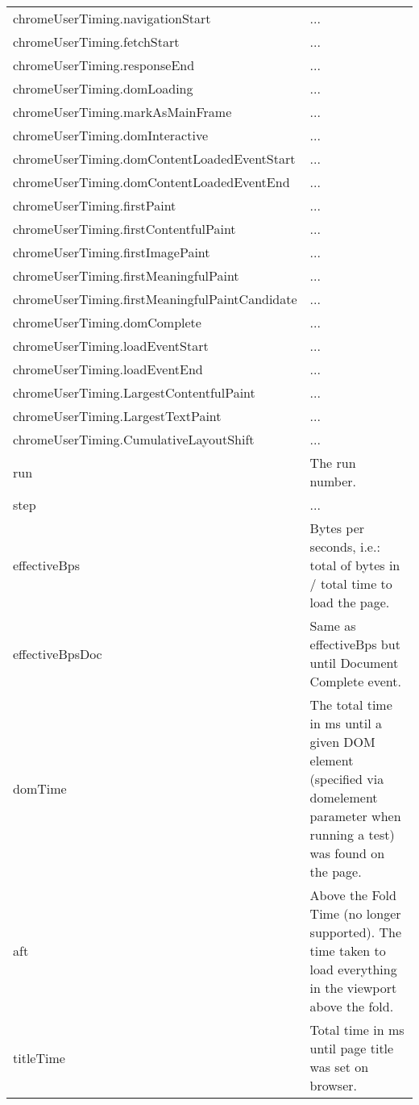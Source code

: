 \begin{center}
\begin{longtable}{ p{0.4\linewidth} | p{0.6\linewidth} }
        chromeUserTiming.navigationStart & ... \\
        chromeUserTiming.fetchStart & ... \\
        chromeUserTiming.responseEnd & ... \\
        chromeUserTiming.domLoading & ... \\
        chromeUserTiming.markAsMainFrame & ... \\
        chromeUserTiming.domInteractive & ... \\
        chromeUserTiming.domContentLoadedEventStart & ... \\
        chromeUserTiming.domContentLoadedEventEnd & ... \\
        chromeUserTiming.firstPaint & ... \\
        chromeUserTiming.firstContentfulPaint & ... \\
        chromeUserTiming.firstImagePaint & ... \\
        chromeUserTiming.firstMeaningfulPaint & ... \\
        chromeUserTiming.firstMeaningfulPaintCandidate & ... \\
        chromeUserTiming.domComplete & ... \\
        chromeUserTiming.loadEventStart & ... \\
        chromeUserTiming.loadEventEnd & ... \\
        chromeUserTiming.LargestContentfulPaint & ... \\
        chromeUserTiming.LargestTextPaint & ... \\
        chromeUserTiming.CumulativeLayoutShift & ... \\
        run & The run number. \\
        step & ... \\
        effectiveBps & Bytes per seconds, i.e.: total of bytes in / total time to load the page. \\
        effectiveBpsDoc & Same as effectiveBps but until Document Complete event. \\
        domTime & The total time in ms until a given DOM element (specified via domelement parameter when running a test) was found on the page. \\
        aft & Above the Fold Time (no longer supported). The time taken to load everything in
the viewport above the fold. \\
        titleTime & Total time in ms until page title was set on browser. \\

\end{longtable}
\end{center}
